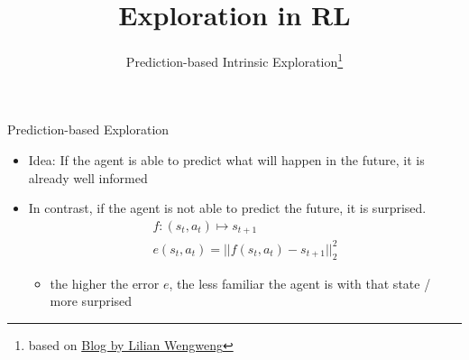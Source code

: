 


\title[RL: Exploration]{Exploration in RL}
\subtitle{Prediction-based Intrinsic Exploration\footnote{based on \href{https://lilianweng.github.io/lil-log/2020/06/07/exploration-strategies-in-deep-reinforcement-learning.html}{Blog by Lilian Wengweng}}}



	
	\maketitle


\begin{frame}[c]{Prediction-based Exploration~}
	
	\begin{itemize}
		\item Idea: If the agent is able to predict what will happen in the future, it is already well informed
		\item In contrast, if the agent is not able to predict the future, it is surprised.
		\begin{eqnarray}
		f: (s_t, a_t) \mapsto s_{t+1} \nonumber \\
		e(s_t, a_t) = || f(s_t, a_t) - s_{t+1}||_2^2\nonumber
		\end{eqnarray}
		\begin{itemize}
			\item the higher the error $e$, the less familiar the agent is with that state / more surprised
		\end{itemize}

	\end{itemize}

	
\end{frame}
